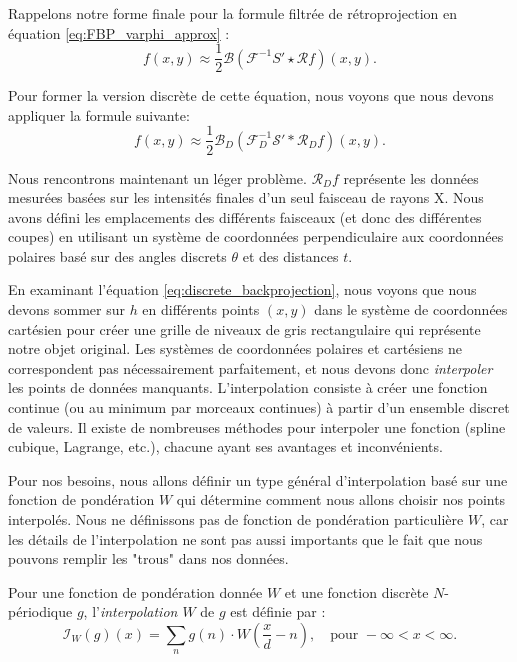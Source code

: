 Rappelons notre forme finale pour la formule filtrée de rétroprojection en équation \eqref{eq:FBP_varphi_approx} :
\begin{equation}
f(x,y) \approx \frac{1}{2} \mathcal{B} (\mathcal{F}^{-1} S' \star \mathcal{R} f)(x,y).
\end{equation}

Pour former la version discrète de cette équation, nous voyons que nous devons appliquer la formule suivante:
\begin{equation}
f(x,y) \approx \frac{1}{2} \mathcal{B}_D \left( \mathcal{F}_D^{-1} \mathcal{S}' \ast \mathcal{R}_D f \right)(x,y).
\end{equation}

Nous rencontrons maintenant un léger problème. $\mathcal{R}_D f$ représente les données mesurées basées sur les intensités finales d'un seul faisceau de rayons X. Nous avons défini les emplacements des différents faisceaux (et donc des différentes coupes) en utilisant un système de coordonnées perpendiculaire aux coordonnées polaires basé sur des angles discrets $\theta$ et des distances $t$.  

En examinant l'équation \eqref{eq:discrete_backprojection}, nous voyons que nous devons sommer sur $h$ en différents points $(x,y)$ dans le système de coordonnées cartésien pour créer une grille de niveaux de gris rectangulaire qui représente notre objet original. Les systèmes de coordonnées polaires et cartésiens ne correspondent pas nécessairement parfaitement, et nous devons donc \emph{interpoler} les points de données manquants. L'interpolation consiste à créer une fonction continue (ou au minimum par morceaux continues) à partir d'un ensemble discret de valeurs. Il existe de nombreuses méthodes pour interpoler une fonction (spline cubique, Lagrange, etc.), chacune ayant ses avantages et inconvénients.  

Pour nos besoins, nous allons définir un type général d'interpolation basé sur une fonction de pondération $W$ qui détermine comment nous allons choisir nos points interpolés. Nous ne définissons pas de fonction de pondération particulière $W$, car les détails de l'interpolation ne sont pas aussi importants que le fait que nous pouvons remplir les "trous" dans nos données.

\begin{definition}
Pour une fonction de pondération donnée $W$ et une fonction discrète $N$-périodique $g$, l'\emph{interpolation $W$} de $g$ est définie par :
\begin{equation}
\mathcal{I}_W(g)(x) = \sum_n g(n) \cdot W\left(\frac{x}{d}-n\right), \quad \text{pour } -\infty < x < \infty.
\end{equation}
\end{definition}

